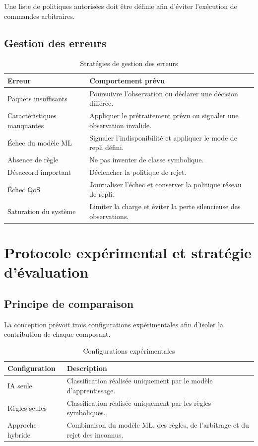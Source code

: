 Une liste de politiques autorisées doit être définie
afin d'éviter l'exécution de commandes arbitraires.

\subsection{Gestion des erreurs}

\begin{table}[H]
\centering
\caption{Stratégies de gestion des erreurs}
\label{tab:erreurs}
\begin{tabularx}{\textwidth}{|l|X|}
\hline
\textbf{Erreur} & \textbf{Comportement prévu} \\
\hline
Paquets insuffisants &
Poursuivre l'observation ou déclarer une décision
différée. \\
\hline
Caractéristiques manquantes &
Appliquer le prétraitement prévu ou signaler
une observation invalide. \\
\hline
Échec du modèle ML &
Signaler l'indisponibilité et appliquer le mode
de repli défini. \\
\hline
Absence de règle &
Ne pas inventer de classe symbolique. \\
\hline
Désaccord important &
Déclencher la politique de rejet. \\
\hline
Échec QoS &
Journaliser l'échec et conserver la politique
réseau de repli. \\
\hline
Saturation du système &
Limiter la charge et éviter la perte silencieuse
des observations. \\
\hline
\end{tabularx}
\end{table}

\section{Protocole expérimental et stratégie d'évaluation}

\subsection{Principe de comparaison}

La conception prévoit trois configurations expérimentales
afin d'isoler la contribution de chaque composant.

\begin{table}[H]
\centering
\caption{Configurations expérimentales}
\label{tab:configurations}
\begin{tabularx}{\textwidth}{|l|X|}
\hline
\textbf{Configuration} & \textbf{Description} \\
\hline
IA seule &
Classification réalisée uniquement par le modèle
d'apprentissage. \\
\hline
Règles seules &
Classification réalisée uniquement par les règles
symboliques. \\
\hline
Approche hybride &
Combinaison du modèle ML, des règles, de l'arbitrage
et du rejet des inconnus. \\
\hline
\end{tabularx}
\end{table}

